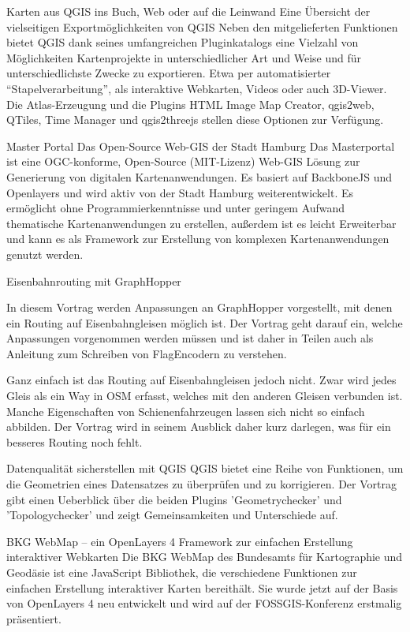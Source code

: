 %
{Karten aus QGIS ins Buch, Web oder auf die Leinwand}%
{Eine Übersicht der vielseitigen Exportmöglichkeiten von QGIS}%
{%
Neben den mitgelieferten Funktionen bietet QGIS dank seines umfangreichen Pluginkatalogs eine Vielzahl von Möglichkeiten Kartenprojekte in unterschiedlicher Art und Weise und für unterschiedlichste Zwecke zu exportieren. Etwa per automatisierter "`Stapelverarbeitung"', als interaktive Webkarten, Videos oder auch 3D-Viewer. Die Atlas-Erzeugung und die Plugins HTML Image Map Creator, qgis2web, QTiles, Time Manager und qgis2threejs stellen diese Optionen zur Verfügung.%
}

%
{Master Portal}%
{Das Open-Source Web-GIS der Stadt Hamburg}%
{%
Das Masterportal ist eine OGC-konforme, Open-Source (MIT-Lizenz) Web-GIS Lösung zur Generierung von digitalen Kartenanwendungen. Es basiert auf BackboneJS und Openlayers und wird aktiv von der Stadt Hamburg weiterentwickelt.
Es ermöglicht ohne Programmierkenntnisse und unter geringem Aufwand thematische Kartenanwendungen zu erstellen, außerdem ist es leicht Erweiterbar und kann es als Framework zur Erstellung von komplexen Kartenanwendungen genutzt werden.%
}

%
{Eisenbahnrouting mit GraphHopper}%
{}%
{%
In diesem Vortrag werden Anpassungen an GraphHopper vorgestellt, mit denen ein Routing auf Eisenbahngleisen möglich ist. Der Vortrag geht darauf ein, welche Anpassungen vorgenommen werden müssen und ist daher in Teilen auch als Anleitung zum Schreiben von FlagEncodern zu verstehen.

Ganz einfach ist das Routing auf Eisenbahngleisen jedoch nicht. Zwar wird jedes Gleis als ein Way in OSM erfasst, welches mit den anderen Gleisen verbunden ist. Manche Eigenschaften von Schienenfahrzeugen lassen sich nicht so einfach abbilden. Der Vortrag wird in seinem Ausblick daher kurz darlegen, was für ein besseres Routing noch fehlt.%
}


%
{Datenqualität sicherstellen mit QGIS}%
{}%
{%
QGIS bietet eine Reihe von Funktionen, um die Geometrien eines Datensatzes zu überprüfen und zu korrigieren. Der Vortrag gibt einen Ueberblick über die beiden Plugins 'Geometrychecker' und 'Topologychecker' und zeigt Gemeinsamkeiten und Unterschiede auf.%
}

%
{BKG WebMap – ein OpenLayers 4 Framework zur einfachen Erstellung interaktiver Webkarten}%
{}%
{%
Die BKG WebMap des Bundesamts für Kartographie und Geodäsie ist eine JavaScript Bibliothek, die verschiedene Funktionen zur einfachen Erstellung interaktiver Karten bereithält. Sie wurde jetzt auf der Basis von OpenLayers 4 neu entwickelt und wird auf der FOSSGIS-Konferenz erstmalig präsentiert.%
}

